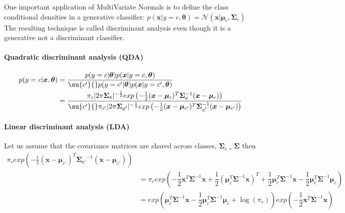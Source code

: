 One important application of MultiVariate Normals is to define the class conditional densities in a generative classifier: $p(\bm{x}|y=c,\bm{\theta}) = \mathcal{N}(\bm{x}|
\bm{\mu}_{c}, \bm{\Sigma}_{c})$\\
The resulting technique is called discriminant analysis even though it is a generative
not a discriminant classifier. 
\paragraph{Quadratic discriminant analysis (QDA)}
\begin{align*}
    p(y=c|\bm{x},\bm{\theta}) 
    &= \dfrac{p(y=c|\bm{\theta})p(\bm{x}|y=c,\bm{\theta})}
    {\su{c'}{}p(y=c'|\bm{\theta})p(\bm{x}|y=c',\bm{\theta})}\\
    &=\dfrac{\pi_{c}\lvert 2\pi\bm{\Sigma_{c}}\rvert^{-\frac{1}{2}}exp\left(
    -\frac{1}{2}(\bm{x}-\bm{\mu}_{c})^{T}\bm{\Sigma_{c}}^{-1}(\bm{x}-\bm{\mu}_{c})\right)}
    {\su{c'}{}\pi_{c'}\lvert 2\pi\bm{\Sigma_{c'}}\rvert^{-\frac{1}{2}}exp\left(
    -\frac{1}{2}(\bm{x}-\bm{\mu}_{c'})^{T}\bm{\Sigma_{c'}}^{-1}(\bm{x}-\bm{\mu}_{c'})
\right)}
\end{align*}

\paragraph{Linear discriminant analysis (LDA)}
Let us assume that the covariance matrices are shared across classes, $\bm{\Sigma}_{c=}
\bm{\Sigma}$ then 
\begin{align*}
    \pi_{c}exp\left(-\frac{1}{2}(\bm{x}-\bm{\mu}_{c'})^{T}\bm{\Sigma_{c'}}^{-1}(\bm{x}-
        \bm{\mu}_{c'})\right)\\
    &= \pi_{c}exp\left(-\dfrac{1}{2}\bm{x}^{T}\bm{\Sigma}^{-1}\bm{x}+\dfrac{1}{2}
        \left(\bm{\mu}_{c}^{T}\bm{\Sigma}^{-1}\bm{x}\right)^{T}
        + \dfrac{1}{2}\bm{\mu}_{c}^{T}\bm{\Sigma}^{-1}\bm{x} -\dfrac{1}{2}\bm{\mu}_{c}^{T}
        \bm{\Sigma}^{-1}\bm{\mu}_{c} \right)
        \\
    &= exp\left(\bm{\mu}_{c}^{T}\bm{\Sigma}^{-1}\bm{x} -\dfrac{1}{2}\bm{\mu}_{c}^{T}
        \bm{\Sigma}^{-1}\bm{\mu}_{c} + \log(\pi_{c})\right)exp\left(-
        \dfrac{1}{2}\bm{x}^{T}\bm{\Sigma}^{-1}\bm{x}\right)
\end{align*}


